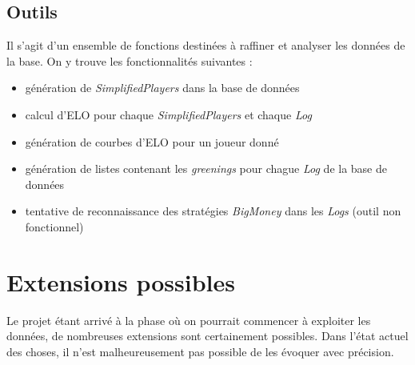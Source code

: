 \subsection{Outils}
Il s'agit d'un ensemble de fonctions destinées à raffiner et analyser les données de la base. On y trouve les fonctionnalités suivantes : 
\begin{itemize}
\item génération de \textit{SimplifiedPlayers} dans la base de données
\item calcul d'ELO pour chaque \textit{SimplifiedPlayers} et chaque \textit{Log}
\item génération de courbes d'ELO pour un joueur donné
\item génération de listes contenant les \textit{greenings} pour chague \textit{Log} de la base de données
\item tentative de reconnaissance des stratégies \textit{BigMoney} dans les \textit{Logs} (outil non fonctionnel)
\end{itemize}

\section{Extensions possibles}
Le projet étant arrivé à la phase où on pourrait commencer à exploiter les données, de nombreuses extensions sont certainement possibles. Dans l'état actuel des choses, il n'est malheureusement pas possible de les évoquer avec précision. 

